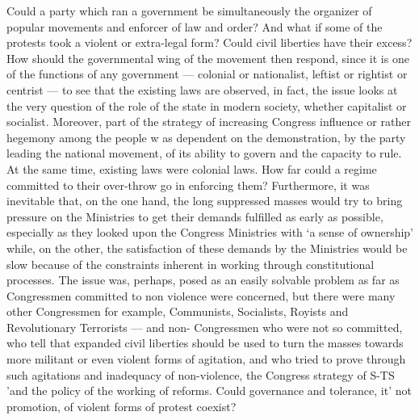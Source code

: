 \begin{multicols}{2}
Could a party which ran a government be simultaneously the organizer of popular movements and enforcer of law and order? And what if some of the protests took a violent or extra-legal form? Could civil liberties have their excess? How should the governmental wing of the movement then respond, since it is one of the functions of any government --- colonial or nationalist, leftist or rightist or centrist --- to see that the existing laws are observed, in fact, the issue looks at the very question of the role of the state in modern society, whether capitalist or socialist. Moreover, part of the strategy of increasing Congress influence or rather hegemony among the people w as dependent on the demonstration, by the party leading the national movement, of its ability to govern and the capacity to rule. At the same time, existing laws were colonial laws. How far could a regime committed to their over-throw go in enforcing them? Furthermore, it was inevitable that, on the one hand, the long suppressed masses would try to bring pressure on the Ministries to get their demands fulfilled as early as possible, especially as they looked upon the Congress Ministries with `a sense of ownership' while, on the other, the satisfaction of these demands by the Ministries would be slow because of the constraints inherent in working through constitutional processes. The issue was, perhaps, posed as an easily solvable problem as far as Congressmen committed to non violence were concerned, but there were many other Congressmen for example, Communists, Socialists, Royists and Revolutionary Terrorists --- and non- Congressmen who were not so committed, who tell that expanded civil liberties should be used to turn the masses towards more militant or even violent forms of agitation, and who tried to prove through such agitations and inadequacy of non-violence, the Congress strategy of S-TS 'and the policy of the working of reforms. Could governance and tolerance, it' not promotion, of violent forms of protest coexist? 


\end{multicols}
